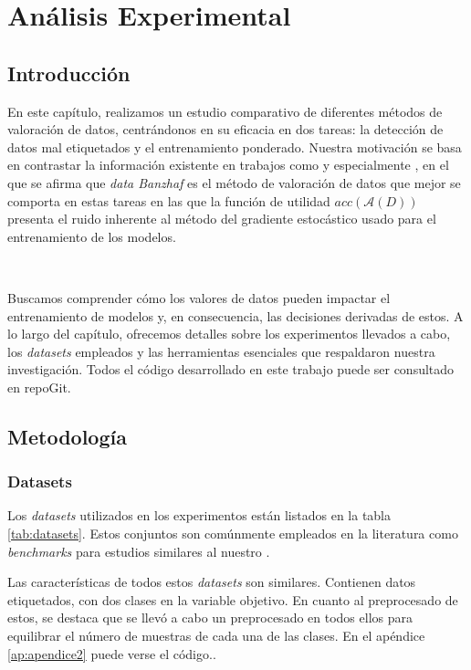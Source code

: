 \chapter{Análisis Experimental}

\section*{Introducción}
En este capítulo, realizamos un estudio comparativo de
diferentes métodos de valoración de datos, centrándonos
en su eficacia en dos tareas: la detección de datos mal
etiquetados y el entrenamiento ponderado. Nuestra motivación
se basa en contrastar la información existente en trabajos
como \cite{dataShapley, betaShapley} y especialmente
\cite{dataBanzhaf}, en el que se afirma que
\textit{data Banzhaf} es el método de valoración de datos
que mejor se comporta en estas tareas en las que la función
de utilidad $acc(\mathcal{A}(D))$ presenta el ruido inherente
al método del gradiente estocástico usado para el entrenamiento
de los modelos.

\

Buscamos comprender cómo los valores de datos pueden impactar el
entrenamiento de modelos y, en consecuencia, las
decisiones derivadas de estos. A lo largo del capítulo,
ofrecemos detalles sobre los experimentos llevados a cabo,
los \textit{datasets} empleados y las herramientas
esenciales que respaldaron nuestra investigación.
Todos el código desarrollado en este trabajo puede
ser consultado en repoGit.

\newpage

\section{Metodología}
\subsection{Datasets}

Los \textit{datasets} utilizados en los experimentos están
listados en la tabla \ref{tab:datasets}. Estos conjuntos
son comúnmente empleados en la literatura como
\textit{benchmarks} para estudios similares al nuestro
\cite{dataBanzhaf}.

Las características de todos estos \textit{datasets} son
similares. Contienen datos etiquetados, con dos clases
en la variable objetivo. En cuanto al preprocesado de estos,
se destaca que se llevó a cabo un
preprocesado en todos ellos para equilibrar
el número de muestras de cada una de las clases.
En el apéndice \ref{ap:apendice2} puede verse el código..


